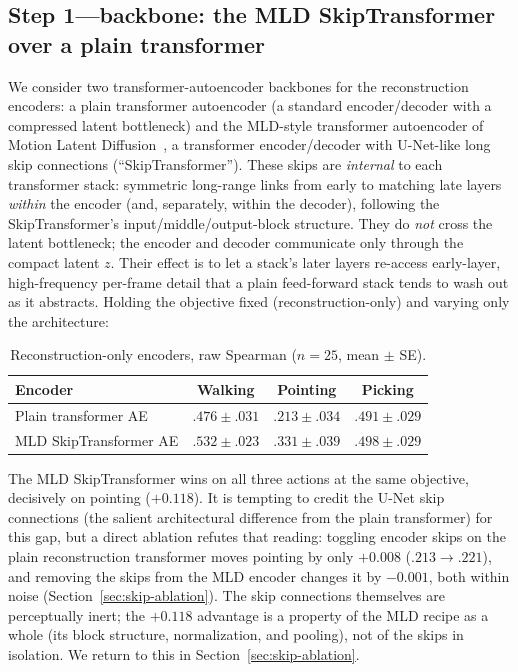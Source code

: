 \documentclass[letterpaper]{article} %
\begin{document}
\subsection{Step 1---backbone: the MLD SkipTransformer over a plain transformer}
\label{sec:step1}
We consider two transformer-autoencoder backbones for the reconstruction encoders: a
{plain transformer autoencoder} (a standard encoder/decoder with a compressed latent
bottleneck) and the {MLD-style transformer autoencoder} of Motion Latent Diffusion~\citep{chen2023mld}, a
transformer encoder/decoder with {U-Net-like long skip connections}
(``SkipTransformer''). These skips are \emph{internal} to each transformer stack:
symmetric long-range links from early to matching late layers \emph{within} the encoder (and,
separately, within the decoder), following the SkipTransformer's input/middle/output-block
structure. They do \emph{not} cross the latent bottleneck; the encoder and decoder communicate
only through the compact latent $z$. Their effect is to let a stack's later layers re-access
early-layer, high-frequency per-frame detail that a plain feed-forward stack tends to wash out
as it abstracts. Holding the {objective} fixed (reconstruction-only) and varying
{only} the architecture:

\begin{table}[h]
\centering
\caption{Reconstruction-only encoders, raw Spearman ($n=25$, mean $\pm$ SE).}
\setlength{\tabcolsep}{1pt}
\small
\begin{tabular}{lccc}
\toprule
Encoder & Walking & Pointing & Picking \\
\midrule
Plain transformer AE          & $.476{\scriptstyle\pm}.031$ & $.213{\scriptstyle\pm}.034$ & $.491{\scriptstyle\pm}.029$ \\
{MLD SkipTransformer AE} & $\mathbf{.532{\scriptstyle\pm}.023}$ & $\mathbf{.331{\scriptstyle\pm}.039}$ & $\mathbf{.498{\scriptstyle\pm}.029}$ \\
\bottomrule
\end{tabular}
\end{table}

The MLD SkipTransformer wins on {all three actions at the same objective}, decisively on
pointing ($+0.118$). It is tempting to credit the U-Net skip connections (the salient architectural
difference from the plain transformer) for this gap, but a direct ablation refutes that reading:
toggling encoder skips on the plain reconstruction transformer moves pointing by only $+0.008$
($.213\!\to\!.221$), and removing the skips from the MLD encoder changes it by $-0.001$, both within
noise (Section~\ref{sec:skip-ablation}). The skip connections themselves are perceptually
{inert}; the $+0.118$ advantage is a property of the MLD recipe as a whole (its block structure,
normalization, and pooling), not of the skips in isolation. We return to this in
Section~\ref{sec:skip-ablation}.
\end{document}
